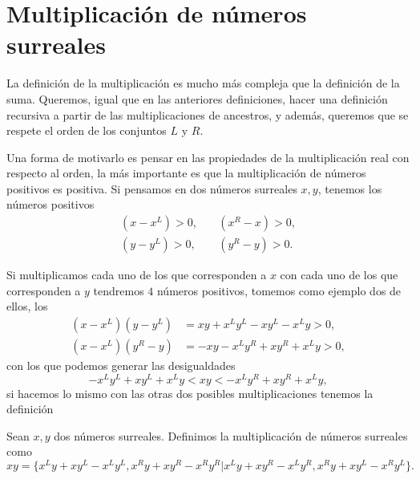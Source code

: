 \section {Multiplicación de números surreales}
    
    La definici\'on de la multiplicaci\'on es mucho m\'as compleja que la definici\'on de la suma. Queremos, igual que en las anteriores definiciones, hacer una definici\'on recursiva a partir de las multiplicaciones de ancestros, y adem\'as, queremos que se respete el orden de los conjuntos $L$ y $R$.

    Una forma de motivarlo es pensar en las propiedades de la multiplicaci\'on real con respecto al orden, la m\'as importante es que la multiplicaci\'on de n\'umeros positivos es positiva. Si pensamos en dos n\'umeros surreales $x,y$, tenemos los n\'umeros positivos
    \begin{align*}
        (x-x^L) > 0, \quad & (x^R-x)>0, \\
        (y-y^L) > 0, \quad & (y^R-y)>0.
    \end{align*}

    Si multiplicamos cada uno de los que corresponden a $x$ con cada uno de los que corresponden a $y$ tendremos $4$ n\'umeros positivos, tomemos como ejemplo dos de ellos, los
    \begin{align*}
        (x-x^L)(y-y^L) &= xy + x^Ly^L - xy^L - x^Ly > 0,\\
        (x-x^L)(y^R-y) &= -xy -x^Ly^R + xy^R + x^Ly > 0,
    \end{align*}
    con los que podemos generar las desigualdades
    \[
        - x^Ly^L + xy^L + x^Ly < xy < -x^Ly^R + xy^R + x^Ly,
    \]
    si hacemos lo mismo con las otras dos posibles multiplicaciones tenemos la definici\'on

    \begin{definition}[Multiplicaci\'on]
        Sean $x, y$ dos n\'umeros surreales. Definimos la multiplicaci\'on de n\'umeros surreales como
        \[
            xy = \{x^Ly+xy^L-x^Ly^L, x^Ry+xy^R-x^Ry^R| x^Ly+xy^R-x^Ly^R, x^Ry+xy^L-x^Ry^L\}.
        \]
    \end{definition}
